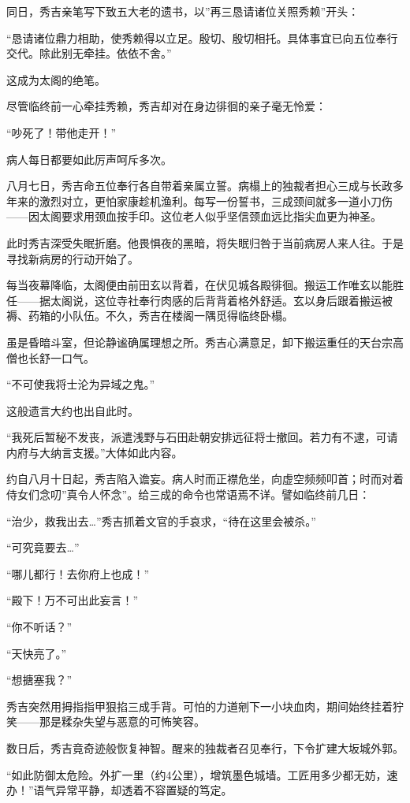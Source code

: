 \documentclass[
]{article}
\begin{document}
同日，秀吉亲笔写下致五大老的遗书，以''再三恳请诸位关照秀赖''开头：

``恳请诸位鼎力相助，使秀赖得以立足。殷切、殷切相托。具体事宜已向五位奉行交代。除此别无牵挂。依依不舍。''

这成为太阁的绝笔。

尽管临终前一心牵挂秀赖，秀吉却对在身边徘徊的亲子毫无怜爱：

``吵死了！带他走开！''

病人每日都要如此厉声呵斥多次。

八月七日，秀吉命五位奉行各自带着亲属立誓。病榻上的独裁者担心三成与长政多年来的激烈对立，更怕家康趁机渔利。每写一份誓书，三成颈间就多一道小刀伤------因太阁要求用颈血按手印。这位老人似乎坚信颈血远比指尖血更为神圣。

此时秀吉深受失眠折磨。他畏惧夜的黑暗，将失眠归咎于当前病房人来人往。于是寻找新病房的行动开始了。

每当夜幕降临，太阁便由前田玄以背着，在伏见城各殿徘徊。搬运工作唯玄以能胜任------据太阁说，这位寺社奉行肉感的后背背着格外舒适。玄以身后跟着搬运被褥、药箱的小队伍。不久，秀吉在楼阁一隅觅得临终卧榻。

虽是昏暗斗室，但论静谧确属理想之所。秀吉心满意足，卸下搬运重任的天台宗高僧也长舒一口气。

``不可使我将士沦为异域之鬼。''

这般遗言大约也出自此时。

``我死后暂秘不发丧，派遣浅野与石田赴朝安排远征将士撤回。若力有不逮，可请内府与大纳言支援。''大体如此内容。

约自八月十日起，秀吉陷入谵妄。病人时而正襟危坐，向虚空频频叩首；时而对着侍女们念叨''真令人怀念''。给三成的命令也常语焉不详。譬如临终前几日：

``治少，救我出去\ldots{}''秀吉抓着文官的手哀求，``待在这里会被杀。''

``可究竟要去\ldots{}''

``哪儿都行！去你府上也成！''

``殿下！万不可出此妄言！''

``你不听话？''

``天快亮了。''

``想搪塞我？''

秀吉突然用拇指指甲狠掐三成手背。可怕的力道剜下一小块血肉，期间始终挂着狞笑------那是糅杂失望与恶意的可怖笑容。

数日后，秀吉竟奇迹般恢复神智。醒来的独裁者召见奉行，下令扩建大坂城外郭。

``如此防御太危险。外扩一里（约4公里），增筑墨色城墙。工匠用多少都无妨，速办！''语气异常平静，却透着不容置疑的笃定。
\end{document}
